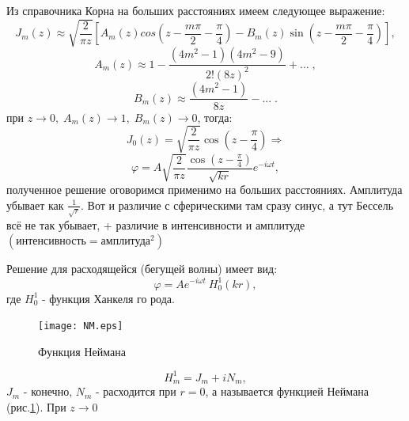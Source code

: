 \documentclass[14pt,a4paper,oneside]{extarticle}	%
\newcommand{\RomanNumeralCaps}[1]{\MakeUppercase{\romannumeral #1}}
\begin{document}
Из справочника Корна на больших расстояниях имеем следующее выражение:
\begin{equation*}
J_{m}(z) \approx \sqrt{\frac{2}{\pi z}}\left[A_{m}(z)cos\left(z - \frac{m\pi}{2} - \frac{\pi}{4} \right) - B_{m}(z)\sin\left(z - \frac{m\pi}{2} - \frac{\pi}{4} \right)   \right],
\end{equation*}
\begin{equation*}
A_{m}(z)  \approx  1 - \frac{(4m^{2}-1)(4m^{2}-9)}{2!(8z)^{2}} + ...\;,
\end{equation*}
\begin{equation*}
B_{m}(z)  \approx  \frac{(4m^{2}-1)}{8z} - ...\;.
\end{equation*}
при $ z \longrightarrow 0 ,\; A_{m}(z) \longrightarrow 1,\; B_{m}(z) \longrightarrow 0 $, тогда:
\begin{equation*}
 J_{0}(z) = \sqrt{\frac{2}{\pi z}}\cos\left(z - \frac{\pi}{4} \right) \Rightarrow
\end{equation*}
\begin{equation*}
\varphi = A\sqrt{\frac{2}{\pi z}}\frac{\cos\left(z - \frac{\pi}{4} \right) }{\sqrt{kr}}e^{-i\omega t},
\end{equation*}
полученное решение оговоримся применимо на больших расстояниях. Амплитуда убывает как $ \frac{1}{\sqrt{r}} $.
Вот и различие с сферическими там сразу синус, а тут Бессель всё не так убывает, + различие в интенсивности и амплитуде $  (\text{интенсивность} = \text{амплитуда}^{2}) $

Решение для расходящейся (бегущей волны) имеет вид:
\begin{equation*}
\varphi = A e^{-i\omega t}\:H_{0}^{1}(kr),
\end{equation*}
где $ H_{0}^{1} $ - функция Ханкеля \RomanNumeralCaps{1} го рода.
\begin{figure}[h!] 	%
	\centering 		%
	\texttt{[image: NM.eps]} %
	\caption{Функция Неймана}
	\label{fig::12}
\end{figure}
 
\begin{equation*}
 H_{m}^{1} = J_{m} + iN_{m},
\end{equation*}
$ J_{m}  $ - конечно, $ N_{m} $ - расходится при $ r = 0 $, а называется функцией Неймана (рис.\ref{fig::12}).
При $ z \longrightarrow 0  $ 
\end{document}
